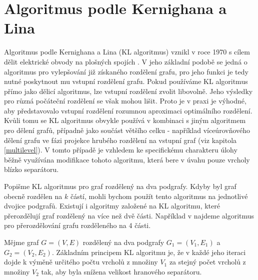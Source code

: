 \documentclass{ctuthesis}
\theoremstyle{plain}
\theoremstyle{definition}
\begin{document}
\section{Algoritmus podle Kernighana a Lina}
\label{KLalgorithm}
Algoritmus podle Kernighana a Lina (KL algoritmus) vznikl v roce 1970 s cílem dělit elektrické obvody na plošných spojích \cite{keli:70}. V jeho základní podobě se jedná o algoritmus pro vylepšování již získaného rozdělení grafu, pro jeho funkci je tedy nutné poskytnout mu vstupní rozdělení grafu. Pokud používáme KL algoritmus přímo jako dělicí algoritmus, lze vstupní rozdělení zvolit libovolně. Jeho výsledky pro různá počáteční rozdělení se však mohou lišit. Proto je v praxi je výhodné, aby představovalo vstupní rozdělení rozumnou aproximaci optimálního rozdělení. Kvůli tomu se KL algoritmus obvykle používá v kombinaci s jiným algoritmem pro dělení grafů, případně jako součást většího celku - například víceúrovňového dělení grafu ve fázi projekce hrubého rozdělení na vstupní graf (viz kapitola \ref{multilevel}). V tomto případě je vzhledem ke specifickému charakteru úlohy běžně využívána modifikace tohoto algoritmu, která bere v úvahu pouze vrcholy blízko separátoru.

Popišme KL algoritmus pro graf rozdělený na dva podgrafy. Kdyby byl graf obecně rozdělen na $k$ částí, mohli bychom použít tento algoritmus na jednotlivé dvojice podgrafů. Existují i algoritmy založené na KL algoritmu, které přerozdělují graf rozdělený na více než dvě části. Například v \cite{suke:88} najdeme algoritmus pro přerozdělování grafu rozděleného na 4 části.

Mějme graf $G=(V,E)$ rozdělený na dva podgrafy $G_1=(V_1,E_1)$ a $G_2=(V_2,E_2)$. Základním principem KL algoritmu je, že v každé jeho iteraci dojde k výměně určitého počtu vrcholů z množiny $V_1$ za stejný počet vrcholů z množiny $V_2$ tak, aby byla snížena velikost hranového separátoru.
\end{document}

